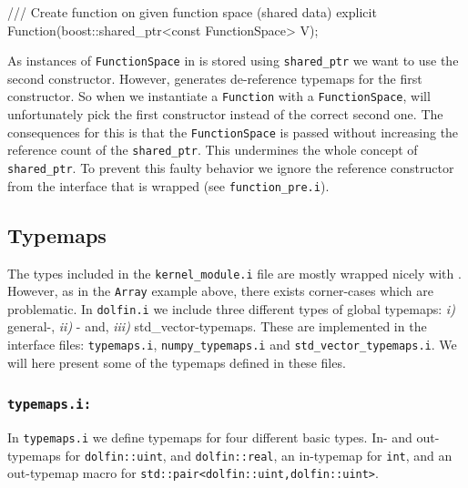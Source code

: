 \begin{code}
\begin{code}
/// Create function on given function space (shared data)
explicit Function(boost::shared_ptr<const FunctionSpace> V);
\end{code}
As instances of \texttt{FunctionSpace} in \pydolfin is stored using \texttt{shared\_ptr} we want \swig to use the second constructor. However, \swig generates de-reference typemaps for the first constructor. So when we instantiate a \texttt{Function} with a \texttt{FunctionSpace}, \swig will unfortunately pick the first constructor instead of the correct second one. The consequences for this is that the \texttt{FunctionSpace} is passed without increasing the reference count of the \texttt{shared\_ptr}. This undermines the whole concept of \texttt{shared\_ptr}. To prevent this faulty behavior we ignore the reference constructor from the interface that is wrapped (see \texttt{function\_pre.i}).
\begin{code}
\end{code}

\subsection{Typemaps}
The types included in the \texttt{kernel\_module.i} file are mostly wrapped nicely with \swig. However, as in the \texttt{Array} example above, there exists corner-cases which are problematic. In \texttt{dolfin.i} we include three different types of global typemaps: \textit{i)} general-, \textit{ii)} \numpy- and, \textit{iii)} std\_vector-typemaps. These are implemented in the interface files: \texttt{typemaps.i}, \texttt{numpy\_}\texttt{typemaps.i} and \texttt{std\_}\texttt{vector\_}\texttt{typemaps.i}. We will here present some of the typemaps defined in these files.\par

\subsubsection{\texttt{typemaps.i:}}
In \texttt{typemaps.i} we define typemaps for four different basic types. In- and out-typemaps for \texttt{dolfin::uint}, and \texttt{dolfin::real}, an in-typemap for \texttt{int}, and an out-typemap macro for \texttt{std::pair<dolfin::uint,}\-\texttt{dolfin::uint>}.\par


\end{code}
